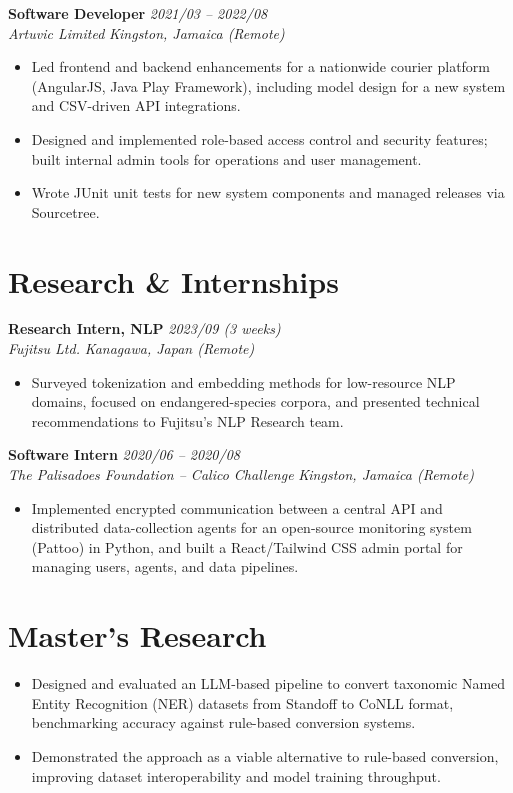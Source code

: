 \documentclass[10pt,letterpaper]{article}
\newcommand{\role}[4]{%
  \textbf{#1} \hfill \textit{#3}\\
  \textit{#2} \hfill \textit{#4}\\[0pt]
}
\begin{document}
\vspace{0pt}
\role{Software Developer}{Artuvic Limited}{2021/03 -- 2022/08}{Kingston, Jamaica (Remote)}
\begin{itemize}
  \item Led frontend and backend enhancements for a nationwide courier platform (AngularJS, Java
    Play Framework), including model design for a new system and CSV-driven API integrations.
  \item Designed and implemented role-based access control and security features; built internal
    admin tools for operations and user management.
  \item Wrote JUnit unit tests for new system components and managed releases via Sourcetree.
\end{itemize}

\section*{Research \& Internships}

\role{Research Intern, NLP}{Fujitsu Ltd.}{2023/09 (3 weeks)}{Kanagawa, Japan (Remote)}
\begin{itemize}
  \item Surveyed tokenization and embedding methods for low-resource NLP domains, focused on
    endangered-species corpora, and presented technical recommendations to Fujitsu's NLP Research
    team.
\end{itemize}

\vspace{0pt}
\role{Software Intern}{The Palisadoes Foundation -- Calico Challenge}{2020/06 -- 2020/08}{Kingston, Jamaica (Remote)}
\begin{itemize}
  \item Implemented encrypted communication between a central API and distributed data-collection
    agents for an open-source monitoring system (Pattoo) in Python, and built a React/Tailwind CSS
    admin portal for managing users, agents, and data pipelines.
\end{itemize}

\section*{Master's Research}
\begin{itemize}\sloppy
  \item Designed and evaluated an LLM-based pipeline to convert taxonomic Named Entity Recognition
    (NER) datasets from Standoff to CoNLL format, benchmarking accuracy against rule-based
    conversion systems.
  \item Demonstrated the approach as a viable alternative to rule-based conversion, improving
    dataset interoperability and model training throughput.
\end{itemize}
\end{document}
